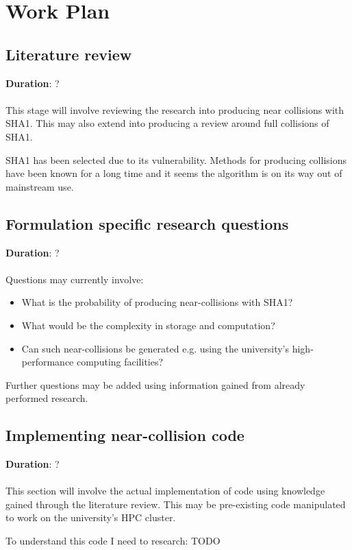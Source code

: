 \chapter{Work Plan}

\section{Literature review}
\label{litReview}
\textbf{Duration}: ? 
\\\\
This stage will involve reviewing the research into producing near collisions with SHA1. This may also extend into producing a review around full collisions of SHA1.
\par
SHA1 has been selected due to its vulnerability. Methods for producing collisions have been known for a long time and it seems the algorithm is on its way out of mainstream use.

\section{Formulation specific research questions}
\textbf{Duration}: ?
\\\\
Questions may currently involve:

\begin{itemize}
    \item What is the probability of producing near-collisions with SHA1?
    \item What would be the complexity in storage and computation?
    \item Can such near-collisions be generated e.g. using the university’s high-performance computing facilities? 
\end{itemize}

Further questions may be added using information gained from already performed research.

\section{Implementing near-collision code}
\label{code}
\textbf{Duration}: ?
\\\\
This section will involve the actual implementation of code using knowledge gained through the literature review. This may be pre-existing code manipulated to work on the university’s HPC cluster.

To understand this code I need to research:
TODO


